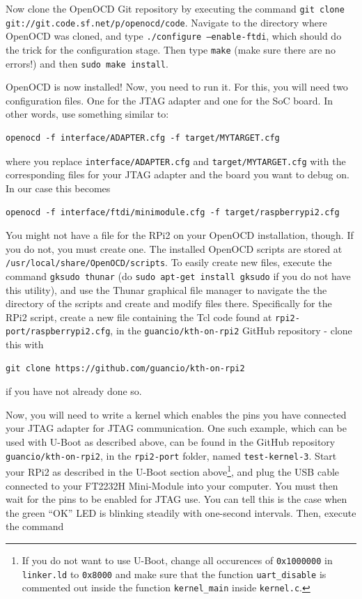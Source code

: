 \documentclass[a4paper,11pt,reqno]{amsart}
\begin{document}
{Now clone the OpenOCD Git repository by executing the command \texttt{git clone git://git.code.sf.net/p/openocd/code}. Navigate to the directory where OpenOCD was cloned, and type \texttt{./configure --enable-ftdi}, which should do the trick for the configuration stage. Then type \texttt{make} (make sure there are no errors!) and then \texttt{sudo make install}.

OpenOCD is now installed! Now, you need to run it. For this, you will need two configuration files. One for the JTAG adapter and one for the SoC board. In other words, use something similar to:

\begin{verbatim}
openocd -f interface/ADAPTER.cfg -f target/MYTARGET.cfg
\end{verbatim}

where you replace \texttt{interface/ADAPTER.cfg} and \texttt{target/MYTARGET.cfg} with the corresponding files for your JTAG adapter and the board you want to debug on. In our case this becomes

\begin{verbatim}
openocd -f interface/ftdi/minimodule.cfg -f target/raspberrypi2.cfg
\end{verbatim}

You might not have a file for the RPi2 on your OpenOCD installation, though. If you do not, you must create one. The installed OpenOCD scripts are stored at \texttt{/usr/local/share/OpenOCD/scripts}. To easily create new files, execute the command \texttt{gksudo thunar} (do \texttt{sudo apt-get install gksudo} if you do not have this utility), and use the Thunar graphical file manager to navigate the the directory of the scripts and create and modify files there. Specifically for the RPi2 script, create a new file containing the Tcl code found at \texttt{rpi2-port/raspberrypi2.cfg}, in the \texttt{guancio/kth-on-rpi2} GitHub repository - clone this with

\begin{verbatim}
git clone https://github.com/guancio/kth-on-rpi2
\end{verbatim}

if you have not already done so.

Now, you will need to write a kernel which enables the pins you have connected your JTAG adapter for JTAG communication. One such example, which can be used with U-Boot as described above, can be found in the GitHub repository \texttt{guancio/kth-on-rpi2}, in the \texttt{rpi2-port} folder, named \texttt{test-kernel-3}. Start your RPi2 as described in the U-Boot section above\footnote{If you do not want to use U-Boot, change all occurences of \texttt{0x1000000} in \texttt{linker.ld} to \texttt{0x8000} and make sure that the function \texttt{uart\_disable} is commented out inside the function \texttt{kernel\_main} inside \texttt{kernel.c}.}, and plug the USB cable connected to your FT2232H Mini-Module into your computer. You must then wait for the pins to be enabled for JTAG use. You can tell this is the case when the green ``OK'' LED is blinking steadily with one-second intervals. Then, execute the command

}
\end{document}
